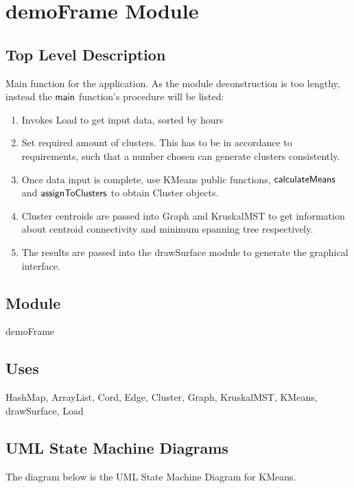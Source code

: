 \documentclass[12pt]{article}
\newcommand{\mname}[1]{\mbox{\sf #1}}
\begin{document}
\section*{demoFrame Module}

\subsection* {Top Level Description}

Main function for the application. As the module deconstruction is too lengthy, instead
the $\mname{main}$ function's procedure will be listed:

\begin{enumerate}
\item Invokes Load to get input data, sorted by hours
\item Set required amount of clusters. This has to be in accordance to requirements, such
that a number chosen can generate clusters consistently.
\item Once data input is complete, use KMeans public functions, $\mname{calculateMeans}$ and
      $\mname{assignToClusters}$ to obtain Cluster objects. 
\item Cluster centroids are passed into Graph and KruskalMST to get information about centroid
connectivity and minimum spanning tree respectively.
\item The results are passed into the drawSurface module to generate the graphical interface.
\end{enumerate}

\subsection*{Module}

demoFrame

\subsection* {Uses}

HashMap, ArrayList, Cord, Edge, Cluster, Graph, KruskalMST, KMeans,
drawSurface, Load

\newpage

\subsection{UML State Machine Diagrams}
The diagram below is the UML State Machine Diagram for KMeans.
\end{document}
